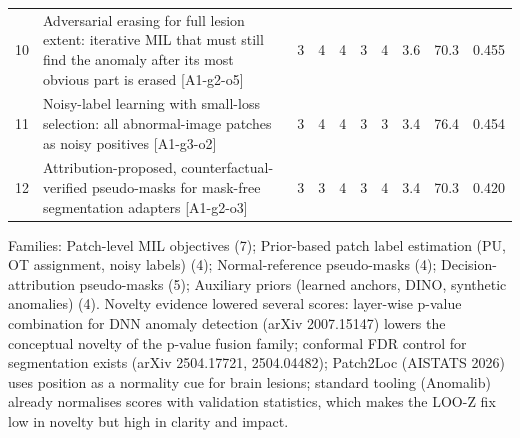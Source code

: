 \documentclass[11pt,a4paper]{article}
\begin{document}
{\begin{longtable}{@{}r >{\raggedright\arraybackslash}p{8.4cm} ccccc c r r@{}}
10 & Adversarial erasing for full lesion extent: iterative MIL that must still find the anomaly after its most obvious part is erased {\footnotesize\color{muted}[A1-g2-o5]} & 3 & 4 & 4 & 3 & 4 & 3.6 & 70.3 & 0.455\\
11 & Noisy-label learning with small-loss selection: all abnormal-image patches as noisy positives {\footnotesize\color{muted}[A1-g3-o2]} & 3 & 4 & 4 & 3 & 3 & 3.4 & 76.4 & 0.454\\
12 & Attribution-proposed, counterfactual-verified pseudo-masks for mask-free segmentation adapters {\footnotesize\color{muted}[A1-g2-o3]} & 3 & 3 & 4 & 3 & 4 & 3.4 & 70.3 & 0.420\\
\bottomrule
\end{longtable}}
{\small Families: Patch-level MIL objectives (7); Prior-based patch label estimation (PU, OT assignment, noisy labels) (4); Normal-reference pseudo-masks (4); Decision-attribution pseudo-masks (5); Auxiliary priors (learned anchors, DINO, synthetic anomalies) (4).}
Novelty evidence lowered several scores: layer-wise p-value combination for DNN anomaly detection (arXiv 2007.15147) lowers the conceptual novelty of the p-value fusion family; conformal FDR control for segmentation exists (arXiv 2504.17721, 2504.04482); Patch2Loc (AISTATS 2026) uses position as a normality cue for brain lesions; standard tooling (Anomalib) already normalises scores with validation statistics, which makes the LOO-Z fix low in novelty but high in clarity and impact.
\end{document}
